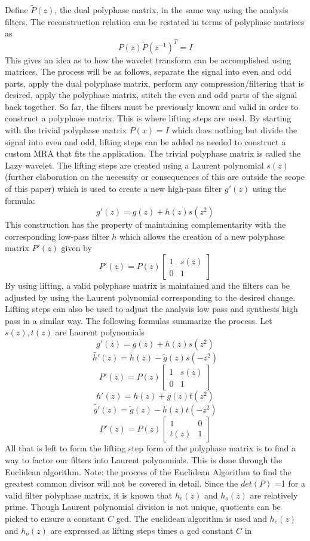 \documentclass{article}
\begin{document}
Define \(\tilde{P}(z)\), the dual polyphase matrix, in the same way using the analysis filters. The reconstruction relation can be restated in terms of polyphase matrices as
\[P(z)\tilde{P}(z^{-1})^T=I\]
This gives an idea as to how the wavelet transform can be accomplished using matrices. The process will be as follows, separate the signal into even and odd parts, apply the dual polyphase matrix, perform any compression/filtering that is desired, apply the polyphase matrix, stitch the even and odd parts of the signal back together.
So far, the filters must be previously known and valid in order to construct a polyphase matrix. This is where lifting steps are used. By starting with the trivial polyphase matrix \(P(x)=I\) which does nothing but divide the signal into even and odd, lifting steps can be added as needed to construct a custom MRA that fits the application. The trivial polyphase matrix is called the Lazy wavelet.
The lifting steps are created using a Laurent polynomial \(s(z)\)(further elaboration on the necessity or consequences of this are outside the scope of this paper) which is used to create a new high-pass filter \(g'(z)\) using the formula:
\[g'(z)=g(z)+h(z)s(z^{2})\]
This construction has the property of maintaining complementarity with the corresponding low-pass filter \(h\) which allows the creation of a new polyphase matrix \(P'(z)\) given by
\[P'(z)=P(z)\begin{bmatrix}
    1 & s(z) \\
    0 & 1
\end{bmatrix}\]
By using lifting, a valid polyphase matrix is maintained and the filters can be adjusted by using the Laurent polynomial corresponding to the desired change.
Lifting steps can also be used to adjust the analysis low pass and synthesis high pass in a similar way. The following formulas summarize the process. Let \(s(z), t(z)\) are Laurent polynomials
\[g'(z)=g(z)+h(z)s(z^{2})\]
\[\tilde{h'}(z)=\tilde{h}(z)-\tilde{g}(z)s(-z^{2})\]
\[P'(z)=P(z)\begin{bmatrix}
    1 & s(z) \\
    0 & 1
\end{bmatrix}\]
\[h'(z)=h(z)+g(z)t(z^{2})\]
\[\tilde{g'}(z)=\tilde{g}(z)-\tilde{h}(z)t(-z^{2})\]
\[P'(z)=P(z)\begin{bmatrix}
    1 & 0 \\
    t(z) & 1
\end{bmatrix}\]
All that is left to form the lifting step form of the polyphase matrix is to find a way to factor our filters into Laurent polynomials. This is done through the Euclidean algorithm. Note: the process of the Euclidean Algorithm to find the greatest common divisor will not be covered in detail. Since the \(det(P)\) =1 for a valid filter polyphase matrix, it is known that \(h_{e}(z)\) and \(h_{o}(z)\) are relatively prime. Though Laurent polynomial division is not unique, quotients can be picked to ensure a constant \(C\) gcd. The euclidean algorithm is used and \(h_{e}(z)\) and \(h_{o}(z)\) are expressed as lifting steps times a gcd constant \(C\) in
\end{document}
